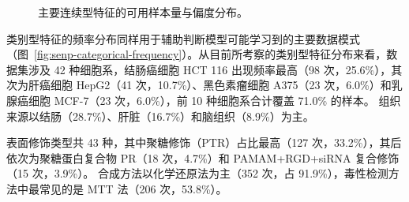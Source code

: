 \begin{figure}[H]
  \begin{minipage}{0.62\linewidth}
    \centering
  \end{minipage}
  \caption{主要连续型特征的可用样本量与偏度分布。}
  \label{fig:senp-continuous-summary}
\end{figure}

类别型特征的频率分布同样用于辅助判断模型可能学习到的主要数据模式（图~\ref{fig:senp-categorical-frequency}）。从目前所考察的类别型特征分布来看，数据集涉及 42 种细胞系，结肠癌细胞 HCT 116 出现频率最高（98 次，25.6\%），其次为肝癌细胞 HepG2（41 次，10.7\%）、黑色素瘤细胞 A375（23 次，6.0\%）和乳腺癌细胞 MCF-7（23 次，6.0\%），前 10 种细胞系合计覆盖 71.0\% 的样本。
组织来源以结肠（28.7\%）、肝脏（16.7\%）和脑组织（8.9\%）为主。

表面修饰类型共 43 种，其中聚糖修饰（PTR）占比最高（127 次，33.2\%），其后依次为聚糖蛋白复合物 PR（18 次，4.7\%）和 PAMAM+RGD+siRNA 复合修饰（15 次，3.9\%）。
合成方法以化学还原法为主（352 次，占 91.9\%），毒性检测方法中最常见的是 MTT 法（206 次，53.8\%）。

